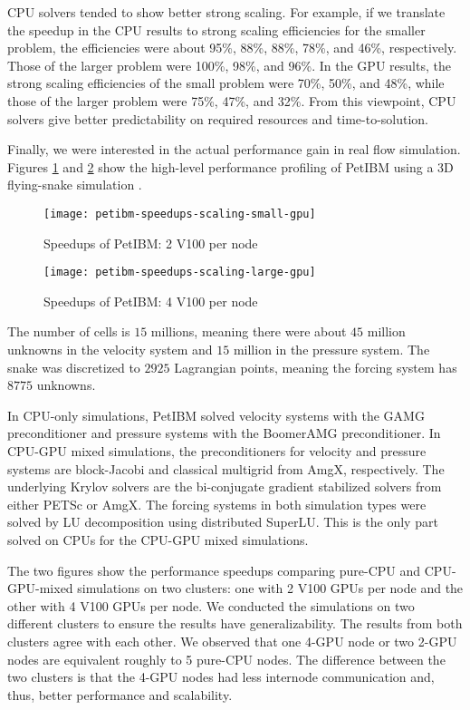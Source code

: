 CPU solvers tended to show better strong scaling.
For example, if we translate the speedup in the CPU results to strong scaling efficiencies for the smaller problem, the efficiencies were about 95\%, 88\%, 88\%, 78\%, and 46\%, respectively.
Those of the larger problem were 100\%, 98\%, and 96\%.
In the GPU results, the strong scaling efficiencies of the small problem were 70\%, 50\%, and 48\%, while those of the larger problem were 75\%, 47\%, and 32\%.
From this viewpoint, CPU solvers give better predictability on required resources and time-to-solution. 

Finally, we were interested in the actual performance gain in real flow simulation.
Figures \ref{fig:petibm-speedups-15M-small} and \ref{fig:petibm-speedups-15M-large} show the high-level performance profiling of PetIBM using a 3D flying-snake simulation \cite{krishnan_lift_2014,krishnan_cuibm_2017}.
\begin{figure}[hbt!]
    \texttt{[image: petibm-speedups-scaling-small-gpu]}
    \caption{Speedups of PetIBM: 2 V100 per node}
    \label{fig:petibm-speedups-15M-small}
\end{figure}
\begin{figure}[hbt!]
    \texttt{[image: petibm-speedups-scaling-large-gpu]}
    \caption{Speedups of PetIBM: 4 V100 per node}
    \label{fig:petibm-speedups-15M-large}
\end{figure}
The number of cells is $15$ millions, meaning there were about $45$ million unknowns in the velocity system and $15$ million in the pressure system.
The snake was discretized to $\num{2925}$ Lagrangian points, meaning the forcing system has $\num{8775}$ unknowns.

In CPU-only simulations, PetIBM solved velocity systems with the GAMG preconditioner and pressure systems with the BoomerAMG preconditioner.
In CPU-GPU mixed simulations, the preconditioners for velocity and pressure systems are block-Jacobi and classical multigrid from AmgX, respectively.
The underlying Krylov solvers are the bi-conjugate gradient stabilized solvers from either PETSc or AmgX.
The forcing systems in both simulation types were solved by LU decomposition using distributed SuperLU.
This is the only part solved on CPUs for the CPU-GPU mixed simulations.

The two figures show the performance speedups comparing pure-CPU and CPU-GPU-mixed simulations on two clusters: one with 2 V100 GPUs per node and the other with 4 V100 GPUs per node.
We conducted the simulations on two different clusters to ensure the results have generalizability.
The results from both clusters agree with each other.
We observed that one 4-GPU node or two 2-GPU nodes are equivalent roughly to 5 pure-CPU nodes.
The difference between the two clusters is that the 4-GPU nodes had less internode communication and, thus, better performance and scalability.
